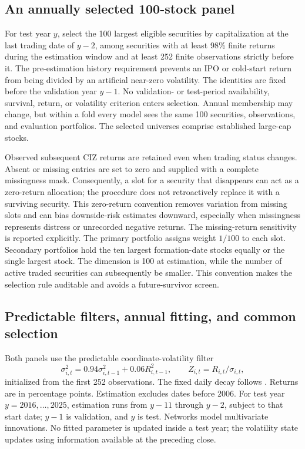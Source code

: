 \documentclass[11pt]{article}
\theoremstyle{definition}\newtheorem{definition}[theorem]{Definition}
\theoremstyle{remark}\newtheorem{remark}[theorem]{Remark}
\begin{document}
\subsection{An annually selected 100-stock panel}
For test year $y$, select the 100 largest eligible securities by capitalization at the last trading date of $y-2$, among securities with at least 98\% finite returns during the estimation window and at least 252 finite observations strictly before it. The pre-estimation history requirement prevents an IPO or cold-start return from being divided by an artificial near-zero volatility. The identities are fixed before the validation year $y-1$. No validation- or test-period availability, survival, return, or volatility criterion enters selection. Annual membership may change, but within a fold every model sees the same 100 securities, observations, and evaluation portfolios. The selected universes comprise established large-cap stocks.

Observed subsequent CIZ returns are retained even when trading status changes. Absent or missing entries are set to zero and supplied with a complete missingness mask. Consequently, a slot for a security that disappears can act as a zero-return allocation; the procedure does not retroactively replace it with a surviving security. This zero-return convention removes variation from missing slots and can bias downside-risk estimates downward, especially when missingness represents distress or unrecorded negative returns. The missing-return sensitivity is reported explicitly. The primary portfolio assigns weight $1/100$ to each slot. Secondary portfolios hold the ten largest formation-date stocks equally or the single largest stock. The dimension is 100 at estimation, while the number of active traded securities can subsequently be smaller. This convention makes the selection rule auditable and avoids a future-survivor screen.

\subsection{Predictable filters, annual fitting, and common selection}
Both panels use the predictable coordinate-volatility filter
\begin{equation}\label{eq:ewma-expanded}
\sigma_{i,t}^2=0.94\sigma_{i,t-1}^2+0.06R_{i,t-1}^2,
\qquad Z_{i,t}=R_{i,t}/\sigma_{i,t},
\end{equation}
initialized from the first 252 observations. The fixed daily decay follows \citet{riskmetrics1996}. Returns are in percentage points. Estimation excludes dates before 2006. For test year $y=2016,\ldots,2025$, estimation runs from $y-11$ through $y-2$, subject to that start date; $y-1$ is validation, and $y$ is test. Networks model multivariate innovations. No fitted parameter is updated inside a test year; the volatility state updates using information available at the preceding close.
\end{document}
